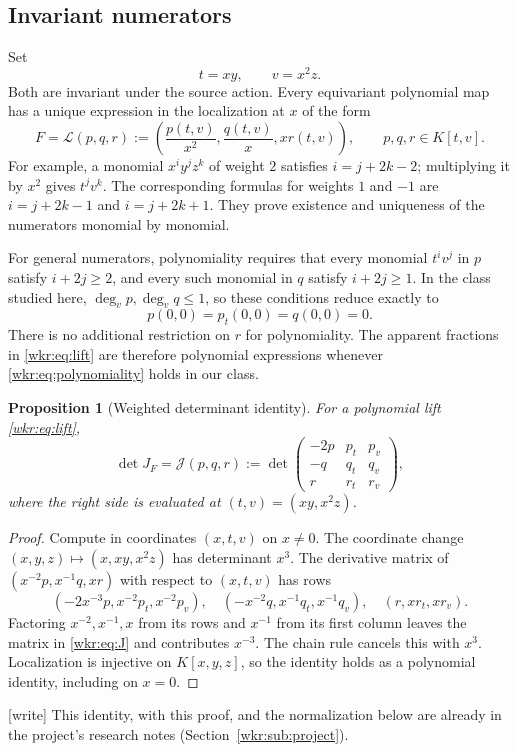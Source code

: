 \documentclass[11pt,a4paper]{article}
\numberwithin{equation}{section}
\newtheorem{proposition}[theorem]{Proposition}
\theoremstyle{definition}
\theoremstyle{remark}
\newcommand{\J}{\mathcal{J}}
\newcommand{\wtag}{\textup{[write]}}%
\begin{document}
\subsection{Invariant numerators}

Set
\begin{equation}\label{wkr:eq:invariants}
t=xy,\qquad v=x^2z.
\end{equation}
Both are invariant under the source action. Every equivariant polynomial
map has a unique expression in the localization at $x$ of the form
\begin{equation}\label{wkr:eq:lift}
F=\mathcal L(p,q,r)
 :=\left(\frac{p(t,v)}{x^2},\frac{q(t,v)}x,xr(t,v)\right),
\qquad p,q,r\in K[t,v].
\end{equation}
For example, a monomial $x^iy^jz^k$ of weight $2$ satisfies
$i=j+2k-2$; multiplying it by $x^2$ gives $t^jv^k$.
The corresponding formulas for weights $1$ and $-1$ are
$i=j+2k-1$ and $i=j+2k+1$. They prove existence and uniqueness of the
numerators monomial by monomial.

For general numerators, polynomiality requires that every monomial $t^iv^j$
in $p$ satisfy $i+2j\ge2$, and every such monomial in $q$ satisfy
$i+2j\ge1$. In the class studied here, $\deg_vp,\deg_vq\le1$, so these
conditions reduce exactly to
\begin{equation}\label{wkr:eq:polynomiality}
p(0,0)=p_t(0,0)=q(0,0)=0.
\end{equation}
There is no additional restriction on $r$ for polynomiality. The apparent
fractions in \eqref{wkr:eq:lift} are therefore polynomial expressions whenever
\eqref{wkr:eq:polynomiality} holds in our class.

\begin{proposition}[Weighted determinant identity]\label{wkr:prop:jacobian}
For a polynomial lift \eqref{wkr:eq:lift},
\begin{equation}\label{wkr:eq:J}
\det J_F=\J(p,q,r):=
\det\begin{pmatrix}
-2p&p_t&p_v\\
-q&q_t&q_v\\
r&r_t&r_v
\end{pmatrix},
\end{equation}
where the right side is evaluated at $(t,v)=(xy,x^2z)$.
\end{proposition}
\begin{proof}
Compute in coordinates $(x,t,v)$ on $x\ne0$. The coordinate change
$(x,y,z)\mapsto(x,xy,x^2z)$ has determinant $x^3$. The derivative matrix of
$(x^{-2}p,x^{-1}q,xr)$ with respect to $(x,t,v)$ has rows
\[
(-2x^{-3}p,x^{-2}p_t,x^{-2}p_v),\quad
(-x^{-2}q,x^{-1}q_t,x^{-1}q_v),\quad
(r,xr_t,xr_v).
\]
Factoring $x^{-2},x^{-1},x$ from its rows and $x^{-1}$ from its first column
leaves the matrix in \eqref{wkr:eq:J} and contributes $x^{-3}$. The chain rule
cancels this with $x^3$. Localization is injective on $K[x,y,z]$, so the
identity holds as a polynomial identity, including on $x=0$.
\end{proof}
\wtag{} This identity, with this proof, and the normalization below are
already in the project's research notes (Section~\ref{wkr:sub:project}).
\end{document}
